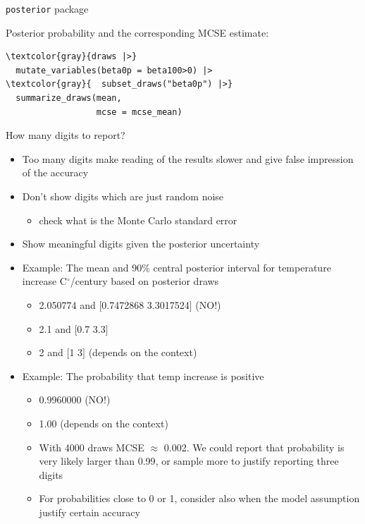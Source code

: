 \documentclass[english,t]{beamer}
\begin{document}
\begin{frame}[fragile]{\texttt{posterior} package}

  Posterior probability and the corresponding MCSE estimate:
\vspace{-.5\baselineskip}
  {\small
\begin{Verbatim}[commandchars=\\\{\}]
\textcolor{gray}{draws |>}
  mutate_variables(beta0p = beta100>0) |>
\textcolor{gray}{  subset_draws("beta0p") |>}
  summarize_draws(mean,
                  mcse = mcse_mean)
\end{Verbatim}
    }

  
\end{frame}

\begin{frame}{How many digits to report?}

\vspace{-0.5\baselineskip}  
  \begin{itemize}
  \item Too many digits make reading of the results slower and give
    false impression of the accuracy
  \item<2-> Don't show digits which are just random noise
    \begin{itemize}
    \item check what is the Monte Carlo standard error
    \end{itemize}
  \item<3-> Show meaningful digits given the posterior uncertainty
  \item<4-> Example: The mean and 90\% central posterior interval for temperature
     increase C$^\circ$/century based on posterior draws
     \begin{itemize}
     \item<5-> {\color{red} 2.050774 and $[$0.7472868 3.3017524$]$} (NO!)
     \item<6-> {\color{darkgreen} 2.1 and $[$0.7 3.3$]$}
    \item<7-> {\color{navyblue} 2 and $[$1 3$]$} (depends on the context)
     \end{itemize}
   \item<8-> Example: The probability that temp increase is
     positive
     \begin{itemize}
     \item<9-> {\color{red} 0.9960000} (NO!)
     \item<10-> {\color{navyblue} 1.00} (depends on the context)
     \item<11-> With 4000 draws MCSE $\approx$ 0.002. We could report
       that probability is {\color{darkgreen} very likely larger than 0.99}, or sample
       more to justify reporting three digits
     \item<12-> For probabilities close to 0 or 1, consider also when
       the model assumption justify certain accuracy
     \end{itemize}
  \end{itemize}
  

\end{frame}
\end{document}
